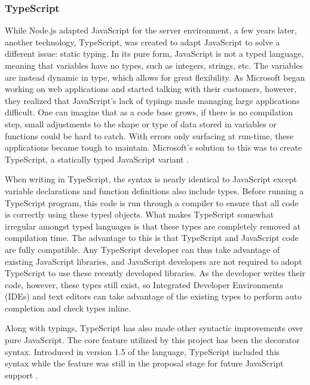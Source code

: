 \subsubsection{TypeScript} \label{sec:typescript}
While Node.js adapted JavaScript for the server environment, a few years later, another technology, TypeScript, was created to adapt JavaScript to solve a different issue: static typing.  In its pure form, JavaScript is not a typed language, meaning that variables have no types, such as integers, strings, etc.  The variables are instead dynamic in type, which allows for great flexibility.  As Microsoft began working on web applications and started talking with their customers, however, they realized that JavaScript's lack of typings made managing large applications difficult.  One can imagine that as a code base grows, if there is no compilation step, small adjustments to the shape or type of data stored in variables or functions could be hard to catch.  With errors only surfacing at run-time, these applications became tough to maintain.  Microsoft's solution to this was to create TypeScript, a statically typed JavaScript variant \cite{idgnewsservicestaffMicrosoftAugmentsJavaScript2012}.

When writing in TypeScript, the syntax is nearly identical to JavaScript except variable declarations and function definitions also include types.  Before running a TypeScript program, this code is run through a compiler to ensure that all code is correctly using these typed objects. What makes TypeScript somewhat irregular amongst typed languages is that these types are completely removed at compilation time. The advantage to this is that TypeScript and JavaScript code are fully compatible.  Any TypeScript developer can thus take advantage of existing JavaScript libraries, and JavaScript developers are not required to adopt TypeScript to use these recently developed libraries.  As the developer writes their code, however, these types still exist, so Integrated Developer Environments (IDEs) and text editors can take advantage of the existing types to perform auto completion and check types inline.

Along with typings, TypeScript has also made other syntactic improvements over pure JavaScript.  The core feature utilized by this project has been the decorator syntax.  Introduced in version 1.5 of the language, TypeScript included this syntax while the feature was still in the proposal stage for future JavaScript support \cite{turnerAnnouncingTypeScript2015}.

